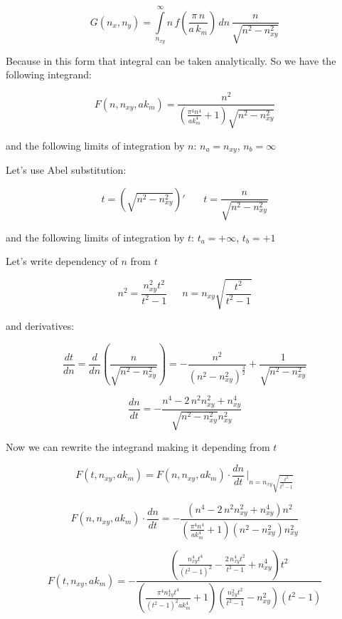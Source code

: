 \documentclass[twoside, 10pt]{article}
\begin{document}
\begin{multicols}{2}
    \[
G\left(n_x, n_y\right) = \int\limits_{n_{xy}}^{\infty}n\,
f\left(\frac{\pi\,n}{a\,k_m}\right)\,dn\,{\frac{n}{\sqrt{n^{2} - n_{xy}^{2}}}}
\]

    Because in this form that integral can be taken analytically. So we have
the following integrand:

    \[F\left(n, n_{xy}, ak_m\right) = \frac{n^{2}}{{\left(\frac{\pi^{4} n^{4}}{\mathit{ak}_{m}^{4}} + 1\right)} \sqrt{n^{2} - n_{\mathit{xy}}^{2}}}\]

    and the following limits of integration by \(n\): \(n_a = n_{xy}\),
\(n_b = \infty\)

    Let's use Abel substitution:

\[t = \left(\sqrt{n^2-n_{xy}^2}\right)' \,\,\,\,\,\,\,\,\,\,\, t = \frac{n}{\sqrt{n^{2} - n_{\mathit{xy}}^{2}}}\]

    and the following limits of integration by \(t\): \(t_a = +\infty\),
\(t_b = +1\)

    Let's write dependency of \(n\) from \(t\)

    \[n^{2} = \frac{n_{\mathit{xy}}^{2} t^{2}}{t^{2} - 1} \,\,\,\,\,\,\,\,\, n = n_{\mathit{xy}} \sqrt{\frac{t^{2}}{t^{2} - 1}}\]

    and derivatives:

    \[\frac{dt}{dn} = \frac{d}{dn} \left( \frac{n}{\sqrt{n^{2} - n_{\mathit{xy}}^{2}}} \right)= -\frac{n^{2}}{{\left(n^{2} - n_{\mathit{xy}}^{2}\right)}^{\frac{3}{2}}} + \frac{1}{\sqrt{n^{2} - n_{\mathit{xy}}^{2}}}\]

    \[\frac{dn}{dt} = -\frac{n^{4} - 2 \, n^{2} n_{\mathit{xy}}^{2} + n_{\mathit{xy}}^{4}}{\sqrt{n^{2} - n_{\mathit{xy}}^{2}} n_{\mathit{xy}}^{2}}\]

    Now we can rewrite the integrand making it depending from \(t\)

    \[F\left(t, n_{xy}, ak_m\right) = F\left(n, n_{xy}, ak_m\right) \cdot \frac{dn}{dt} \, \Bigg\rvert_{ n = n_{\mathit{xy}} \sqrt{\frac{t^{2}}{t^{2} - 1}} }\]

\[F\left(n, n_{xy}, ak_m\right) \cdot \frac{dn}{dt} = -\frac{{\left(n^{4} - 2 \, n^{2} n_{\mathit{xy}}^{2} + n_{\mathit{xy}}^{4}\right)} n^{2}}{{\left(\frac{\pi^{4} n^{4}}{\mathit{ak}_{m}^{4}} + 1\right)} {\left(n^{2} - n_{\mathit{xy}}^{2}\right)} n_{\mathit{xy}}^{2}}\]

\[F\left(t, n_{xy}, ak_m\right) = -\frac{{\left(\frac{n_{\mathit{xy}}^{4} t^{4}}{{\left(t^{2} - 1\right)}^{2}} - \frac{2 \, n_{\mathit{xy}}^{4} t^{2}}{t^{2} - 1} + n_{\mathit{xy}}^{4}\right)} t^{2}}{{\left(\frac{\pi^{4} n_{\mathit{xy}}^{4} t^{4}}{{\left(t^{2} - 1\right)}^{2} \mathit{ak}_{m}^{4}} + 1\right)} {\left(\frac{n_{\mathit{xy}}^{2} t^{2}}{t^{2} - 1} - n_{\mathit{xy}}^{2}\right)} {\left(t^{2} - 1\right)}}\]


\end{multicols}
\end{document}
